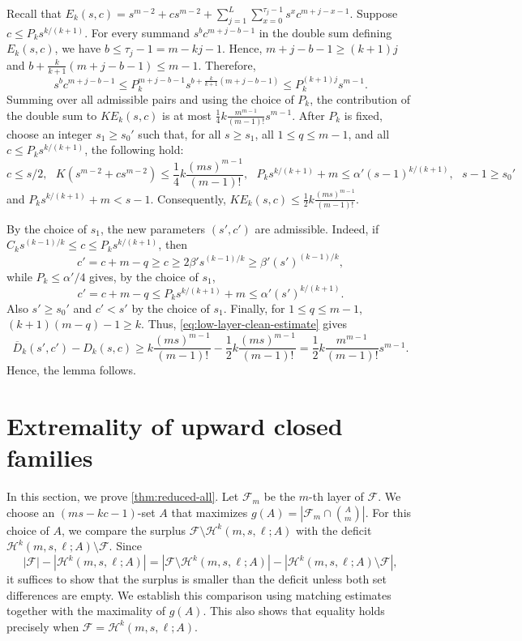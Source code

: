 \documentclass[10pt,a4paper]{article}
\numberwithin{equation}{section}
\theoremstyle{definition}
\newcommand{\F}{\mathcal F}
\begin{document}
Recall that $E_k(s,c)=s^{m-2}+cs^{m-2}+ \sum_{j=1}^{L}\sum_{x=0}^{\tau_j-1}s^x c^{m+j-x-1}$.
Suppose $c\le P_k s^{k/(k+1)}$.
For every summand $s^bc^{m+j-b-1}$ in the double sum defining
$E_k(s,c)$, we have $b\le\tau_j-1=m-kj-1$.
Hence, $m+j-b-1\ge (k+1)j$ and $b+\frac{k}{k+1}(m+j-b-1)\le m-1$.
Therefore,
\[
        s^bc^{m+j-b-1}
        \le
        P_k^{m+j-b-1}
        s^{b+\frac{k}{k+1}(m+j-b-1)}
        \le
        P_k^{(k+1)j}s^{m-1}.
\]
Summing over all admissible pairs and using the choice of $P_k$, the
contribution of the double sum to $K E_k(s,c)$ is at most
$\frac14 k\frac{m^{m-1}}{(m-1)!}s^{m-1}$.
After $P_k$ is fixed, choose an integer $s_1\ge s_0'$ such that,
for all $s\ge s_1$, all $1\le q\le m-1$, and all
$c\le P_k s^{k/(k+1)}$, the following hold:
\[
        c\le s/2, \text{ }
        K(s^{m-2}+cs^{m-2})
        \le
        \frac14 k\frac{(ms)^{m-1}}{(m-1)!}, \text{ }
        P_k s^{k/(k+1)}+m
        \le \alpha'(s-1)^{k/(k+1)}, \text{ }
        s-1\ge s_0'
\]
and $P_k s^{k/(k+1)}+m<s-1$.
Consequently, $K E_k(s,c) \le \frac12 k\frac{(ms)^{m-1}}{(m-1)!}$.

By the choice of $s_1$, the new parameters $(s',c')$ are admissible.
Indeed, if $C_k s^{(k-1)/k}\le c\le P_k s^{k/(k+1)}$, then
\[
        c'=c+m-q\ge c\ge 2\beta' s^{(k-1)/k}
        \ge \beta'(s')^{(k-1)/k},
\]
while $P_k\le\alpha'/4$ gives, by the choice of $s_1$,
\[
        c'=c+m-q
        \le P_k s^{k/(k+1)}+m
        \le \alpha'(s')^{k/(k+1)}.
\]
Also $s'\ge s_0'$ and $c'<s'$ by the choice of $s_1$.
Finally, for $1\le q\le m-1$, $(k+1)(m-q)-1\ge k$.
Thus, \eqref{eq:low-layer-clean-estimate} gives
\[
        \overline D_k(s',c')-D_k(s,c)
        \ge
        k\frac{(ms)^{m-1}}{(m-1)!}
        -
        \frac12 k\frac{(ms)^{m-1}}{(m-1)!}=\frac12 k\frac{m^{m-1}}{(m-1)!}s^{m-1}.
\]
Hence, the lemma follows.


\section{Extremality of upward closed families}\label{sec:proof-reduced}

In this section, we prove \cref{thm:reduced-all}.
Let $\F_m$ be the $m$-th layer of $\F$.
We choose an $(ms-kc-1)$-set $A$ that maximizes $g(A)=|\F_m\cap\binom{A}{m}|$.
For this choice of $A$, we compare the surplus $\F\setminus\mathcal H^k(m,s,\ell;A)$ with the deficit $\mathcal H^k(m,s,\ell;A)\setminus\F$.
Since
\[
        |\F|-|\mathcal H^k(m,s,\ell;A)|
        =
        |\F\setminus\mathcal H^k(m,s,\ell;A)|
        -
        |\mathcal H^k(m,s,\ell;A)\setminus\F|,
\]
it suffices to show that the surplus is smaller than the deficit unless
both set differences are empty. We establish this comparison using
matching estimates together with the maximality of $g(A)$. This also
shows that equality holds precisely when
$\F=\mathcal H^k(m,s,\ell;A)$.
\end{document}
